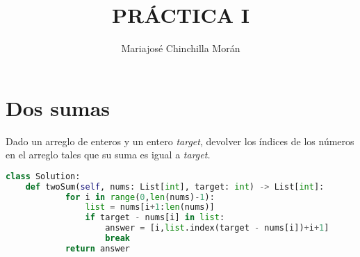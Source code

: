 \documentclass{article}
\title{PRÁCTICA I}
\author{Mariajosé Chinchilla Morán}
\date{}
\begin{document}
\maketitle

\section*{Dos sumas}
Dado un arreglo de enteros y un entero \textit{target}, devolver los índices de los números en el arreglo tales que su suma es igual a \textit{target.} \\

\begin{lstlisting}[language=Python]
class Solution:
    def twoSum(self, nums: List[int], target: int) -> List[int]:
            for i in range(0,len(nums)-1):
                list = nums[i+1:len(nums)]
                if target - nums[i] in list:
                    answer = [i,list.index(target - nums[i])+i+1]
                    break
            return answer
\end{lstlisting}
\vspace{0.5cm}
\end{document}
